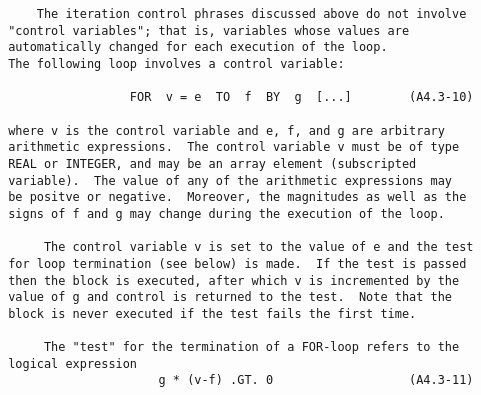\begin{verbatim}
     The iteration control phrases discussed above do not involve
 "control variables"; that is, variables whose values are
 automatically changed for each execution of the loop.
 The following loop involves a control variable:

                  FOR  v = e  TO  f  BY  g  [...]        (A4.3-10)

 where v is the control variable and e, f, and g are arbitrary
 arithmetic expressions.  The control variable v must be of type
 REAL or INTEGER, and may be an array element (subscripted
 variable).  The value of any of the arithmetic expressions may
 be positve or negative.  Moreover, the magnitudes as well as the
 signs of f and g may change during the execution of the loop.

      The control variable v is set to the value of e and the test
 for loop termination (see below) is made.  If the test is passed
 then the block is executed, after which v is incremented by the
 value of g and control is returned to the test.  Note that the
 block is never executed if the test fails the first time.

      The "test" for the termination of a FOR-loop refers to the
 logical expression
                      g * (v-f) .GT. 0                   (A4.3-11)
\end{verbatim}
